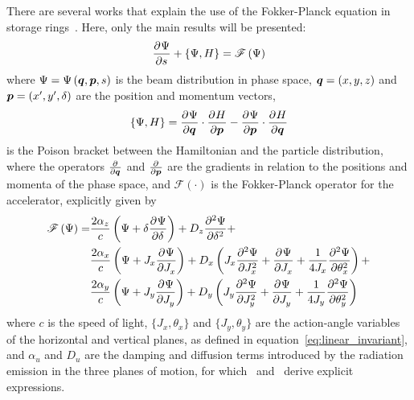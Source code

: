     There are several works that explain the use of the Fokker-Planck equation in storage rings~\cite{Lindberg2016,Suzuki1983,Suzuki1986,Lee1999,Wiedemann2007}. Here, only the main results will be presented:
    \begin{align}\label{eq:fokker_planck_equation}
        \derpar{\Psi}{s} + \poison{\Psi, H} = \mathscr{F}\fof{\Psi}
    \end{align}
    where $\Psi = \Psi\fof{\vect{q},\vect{p}, s}$ is the beam distribution in phase space, $\vect{q}=(x,y,z)$ and $\vect{p}=(x',y',\delta)$ are the position and momentum vectors,
    \begin{align}
        \poison{\Psi, H} = \derpar{\Psi}{\vect{q}}\cdot\derpar{H}{\vect{p}} -
                           \derpar{\Psi}{\vect{p}}\cdot\derpar{H}{\vect{q}}
    \end{align}
    is the Poison bracket between the Hamiltonian and the particle distribution, where the operators $\derpar{}{\vect{q}}$ and $\derpar{}{\vect{p}}$ are the gradients in relation to the positions and momenta of the phase space, and $\mathscr{F}(\cdot)$ is the Fokker-Planck operator for the accelerator, explicitly given by~\cite[eq. 33]{Lindberg2016}
    \begin{align}\label{eq:fokker_planck}\nonumber
        \mathscr{F}\fof{\Psi} = & \frac{2\alpha_z}{c}\fof{
                                            \Psi + \delta\derpar{\Psi}{\delta}
                                      } + D_z \derpar[2]{\Psi}{\delta} + \\\nonumber
                                   & \frac{2\alpha_x}{c}\fof{
                                         \Psi + J_x\derpar{\Psi}{J_x}
                                     } + D_x \fof{J_x\derpar[2]{\Psi}{J_x} +
                                                 \derpar{\Psi}{J_x} +
                                                 \frac{1}{4J_x}\derpar[2]{\Psi}{\theta_x}
                                          } + \\
                                   & \frac{2\alpha_y}{c}\fof{
                                        \Psi + J_y\derpar{\Psi}{J_y}
                                     } + D_y \fof{J_y\derpar[2]{\Psi}{J_y} +
                                                 \derpar{\Psi}{J_y} +
                                                 \frac{1}{4J_y}\derpar[2]{\Psi}{\theta_y}
                                         }
    \end{align}
    where $c$ is the speed of light, $\{J_x, \theta_x\}$ and $\{J_y, \theta_y\}$ are the action-angle variables of the horizontal and vertical planes, as defined in equation~\eqref{eq:linear_invariant}, and $\alpha_u$ and $D_u$ are the damping and diffusion terms introduced by the radiation emission in the three planes of motion, for which~ and~ derive explicit expressions.

